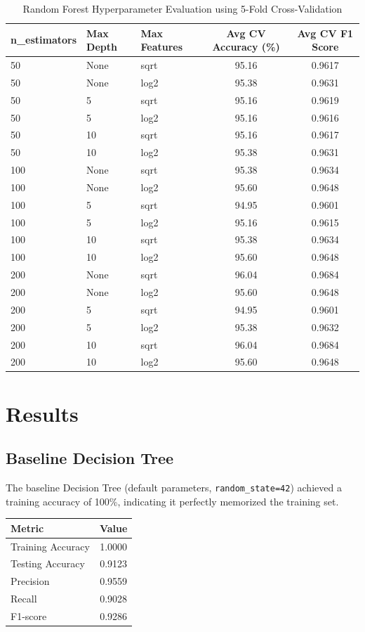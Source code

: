 \documentclass[12pt,a4paper]{article}
\begin{document}
\begin{table}[H]
\centering
\caption{Random Forest Hyperparameter Evaluation using 5-Fold Cross-Validation}
\label{tab:rf-tuning}
\small
\begin{tabular}{lllcc}
\toprule
n\_estimators & Max Depth & Max Features & Avg CV Accuracy (\%) & Avg CV F1 Score \\
\midrule
50  & None & sqrt & 95.16 & 0.9617 \\
50  & None & log2 & 95.38 & 0.9631 \\
50  & 5    & sqrt & 95.16 & 0.9619 \\
50  & 5    & log2 & 95.16 & 0.9616 \\
50  & 10   & sqrt & 95.16 & 0.9617 \\
50  & 10   & log2 & 95.38 & 0.9631 \\
100 & None & sqrt & 95.38 & 0.9634 \\
100 & None & log2 & 95.60 & 0.9648 \\
100 & 5    & sqrt & 94.95 & 0.9601 \\
100 & 5    & log2 & 95.16 & 0.9615 \\
100 & 10   & sqrt & 95.38 & 0.9634 \\
100 & 10   & log2 & 95.60 & 0.9648 \\
200 & None & sqrt & 96.04 & 0.9684 \\
200 & None & log2 & 95.60 & 0.9648 \\
200 & 5    & sqrt & 94.95 & 0.9601 \\
200 & 5    & log2 & 95.38 & 0.9632 \\
200 & 10   & sqrt & 96.04 & 0.9684 \\
200 & 10   & log2 & 95.60 & 0.9648 \\
\bottomrule
\end{tabular}
\end{table}

\section{Results}

\subsection{Baseline Decision Tree}
The baseline Decision Tree (default parameters, \texttt{random\_state=42}) achieved a training accuracy of 100\%, indicating it perfectly memorized the training set.

\begin{tabular}{lc}
\toprule
Metric & Value\\
\midrule
Training Accuracy & 1.0000 \\
Testing Accuracy & 0.9123 \\
Precision & 0.9559 \\
Recall & 0.9028 \\
F1-score & 0.9286 \\
\bottomrule
\end{tabular}
\end{document}
